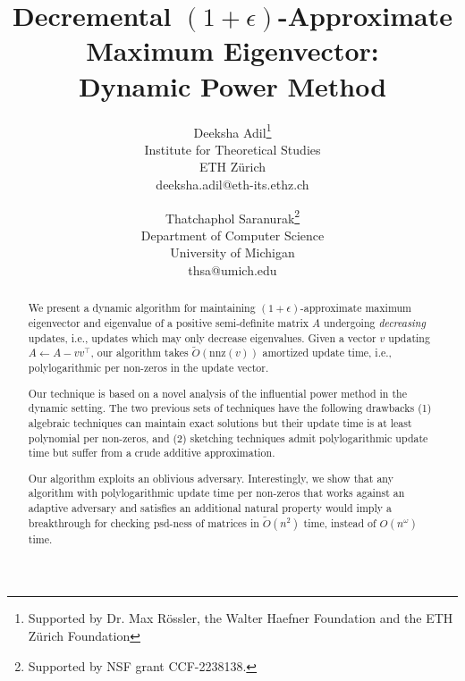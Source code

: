 \documentclass[11pt]{article}
\newcommand{\deeksha}{\Authornote{Deeksha}}
\begin{document}
	
	
	\title{Decremental $(1+\epsilon)$-Approximate Maximum Eigenvector:\\Dynamic Power Method}
	\author{Deeksha Adil\thanks{Supported by Dr. Max R\"ossler, the Walter Haefner Foundation and the ETH Z\"urich Foundation}\\Institute for Theoretical Studies\\ETH Zürich\\deeksha.adil@eth-its.ethz.ch \and Thatchaphol Saranurak\thanks{Supported by NSF grant CCF-2238138.}\\Department of Computer Science\\University of Michigan\\thsa@umich.edu}
	\maketitle
	
	
	\maketitle
	
	
	\begin{abstract}
		We present a dynamic algorithm for maintaining $(1+\epsilon)$-approximate maximum eigenvector and eigenvalue of a positive semi-definite matrix $A$ undergoing \emph{decreasing} updates, i.e., updates which may only decrease eigenvalues. Given a vector $v$ updating $A\gets A-vv^{\top}$, our algorithm takes $\tilde{O}(\mathrm{nnz}(v))$ amortized update time, i.e., polylogarithmic per non-zeros in the update vector.
		
		Our technique is based on a novel analysis of the influential power method in the dynamic setting. The two previous sets of techniques have the following drawbacks (1) algebraic techniques can maintain exact solutions but their update time is at least polynomial per non-zeros, and (2) sketching techniques admit polylogarithmic update time but suffer from a crude additive approximation.
		
		Our algorithm exploits an oblivious adversary. 
        Interestingly, we show that any algorithm with polylogarithmic update time per non-zeros that works against an adaptive adversary and satisfies an additional natural property would imply a breakthrough for checking psd-ness of matrices in $\tilde{O}(n^{2})$ time, instead of $O(n^{\omega})$ time.
	\end{abstract}
	
	\newpage
	\tableofcontents
	\newpage
	
	
	
	
	
	
	 \newpage
	\printbibliography
	
	
	 \newpage
	\appendix
	
        
        
\end{document}
